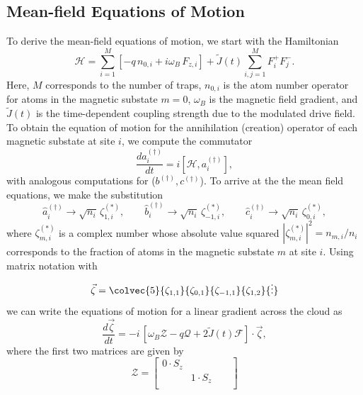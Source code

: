 \begin{bibunit}
\subsection{Mean-field Equations of Motion}
To derive the mean-field equations of motion, we start with the Hamiltonian
\begin{equation}
    \mathcal H = \sum_{i=1}^M\left[ -q\, n_{0,i} +i\omega_B\,{F}_{z,i}\right] + \tilde{J}(t)\sum_{i,j = 1}^M {F}^+_i {F}^-_j.
\end{equation}
Here, $M$ corresponds to the number of traps, $n_{0,i}$ is the atom number operator for atoms in the magnetic substate $m = 0$, $\omega_B$ is the magnetic field gradient, and $\tilde{J}(t)$ is the time-dependent coupling strength due to the modulated drive field.  To obtain the equation of motion for the annihilation (creation) operator of each magnetic substate at site $i$, we compute the commutator
\begin{equation}
    \frac{d{a}^{(\dagger)}_{i}}{dt} = i[\mathcal H,{a}^{(\dagger)}_{i}],
\end{equation}
 with analogous computations for ($b^{(\dagger)},c^{(\dagger)}$). To arrive at the the mean field equations, we make the substitution
\begin{equation}
    \hat{a}^{(\dagger)}_{i} \rightarrow \sqrt{n_i}\,\zeta^{(*)}_{1,i}, \qquad
    \hat{b}^{(\dagger)}_{i} \rightarrow \sqrt{n_i}\,\zeta^{(*)}_{-1,i}, \qquad
    \hat{c}^{(\dagger)}_{i} \rightarrow \sqrt{n_i}\,\zeta^{(*)}_{0,i},
\end{equation}
where $\zeta^{(*)}_{m,i}$ is a complex number whose absolute value squared $|\zeta^{(*)}_{m, i}|^2 = n_{m,i}/n_i$ corresponds to the fraction of atoms in the magnetic substate $m$ at site $i$.
Using matrix notation with 
\begin{equation}
    \vec{\zeta} = \colvec{5}{\zeta_{1,1}}{\zeta_{0,1}}{\zeta_{-1,1}}{\zeta_{1,2}}{\vdots}
\end{equation}
we can write the equations of motion for a linear gradient across the cloud as
\begin{equation}
    \frac{d\vec{\zeta}}{dt} = -i\,\left[\omega_B \mathcal{Z}-q\mathcal{Q}+2\tilde{J}(t)\mathcal{F}\right]\cdot\vec{\zeta},
\end{equation}
where the first two matrices are given by
\begin{equation}
  \mathcal{Z} =
  \begin{bmatrix}
    0 \cdot S_z & & \\
    &1\cdot S_z & &\\

\end{bmatrix}
\end{equation}
\end{bibunit}
